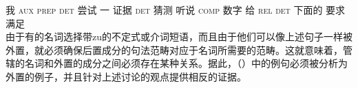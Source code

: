      我 \textsc{aux} \spacebr{}\textsc{prep} \spacebr{}\textsc{det} 尝试 \spacebr{}一 证据 \spacebr{}\textsc{det} 猜测 {} 听说 \spacebr{}\textsc{comp} \expl{} 数字 给 \textsc{rel} \textsc{det} 下面的 要求 满足\\
\zl
由于有的名词选择带zu的不定式或介词短语，而且由于他们可以像上述句子一样被外置，就必须确保后置成分的句法范畴对应于名词所需要的范畴。这就意味着，管辖的名词和外置的成分之间必须存在某种关系。据此，（）中的例句必须被分析为外置的例子，并且针对上述讨论的观点提供相反的证据。 

